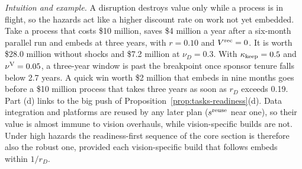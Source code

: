 \noindent\emph{Intuition and example.} A disruption destroys value only while a process is in flight, so the hazards act like a higher discount rate on work not yet embedded. Take a process that costs \$10 million, saves \$4 million a year after a six-month parallel run and embeds at three years, with $r=0.10$ and $V^{\rm rec}=0$. It is worth \$28.0 million without shocks and \$7.2 million at $\nu_D=0.3$. With $\kappa_{\rm keep}=0.5$ and $\nu^{\rm V}=0.05$, a three-year window is past the breakpoint once sponsor tenure falls below 2.7 years. A quick win worth \$2 million that embeds in nine months goes before a \$10 million process that takes three years as soon as $r_D$ exceeds 0.19. Part (d) links to the big push of Proposition~\ref{prop:tasks-readiness}(d). Data integration and platforms are reused by any later plan ($s^{\rm reuse}$ near one), so their value is almost immune to vision overhauls, while vision-specific builds are not. Under high hazards the readiness-first sequence of the core section is therefore also the robust one, provided each vision-specific build that follows embeds within $1/r_D$.

